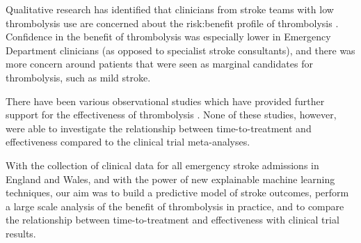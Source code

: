 Qualitative research has identified that clinicians from stroke teams with low thrombolysis use are concerned about the risk:benefit profile of thrombolysis \cite{jarvie_stroke_2024}. Confidence in the benefit of thrombolysis was especially lower in Emergency Department clinicians (as opposed to specialist stroke consultants), and there was more concern around patients that were seen as marginal candidates for thrombolysis, such as mild stroke.

There have been various observational studies which have provided further support for the effectiveness of thrombolysis \cite{wahlgren_thrombolysis_2007, wahlgren_thrombolysis_2008, manawadu_observational_2013, willeit_thrombolysis_2015}. None of these studies, however, were able to investigate the relationship between time-to-treatment and effectiveness compared to the clinical trial meta-analyses.

With the collection of clinical data for all emergency stroke admissions in England and Wales, and with the power of new explainable machine learning techniques, our aim was to build a predictive model of stroke outcomes, perform a large scale analysis of the benefit of thrombolysis in practice, and to compare the relationship between time-to-treatment and effectiveness with clinical trial results.
